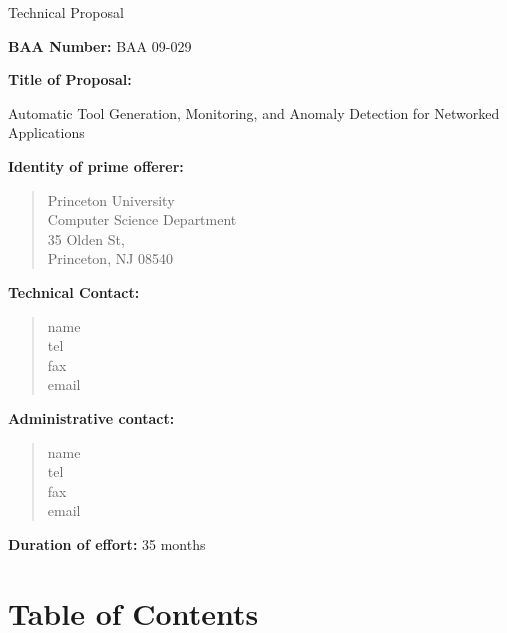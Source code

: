 \documentclass[12pt]{article}
\begin{document}
\begin{center}
{\Large Technical Proposal}
\end{center}

{\bf BAA Number:} BAA 09-029

\vspace{.5in}

{\bf Title of Proposal:}  

Automatic Tool Generation, Monitoring, and Anomaly Detection for Networked Applications

\vspace{.5in}

{\bf Identity of prime offerer:}
\begin{quote}
Princeton University \\
Computer Science Department \\
35 Olden St, \\
Princeton, NJ 08540
\end{quote}

\vspace{.5in}

{\bf Technical Contact:}  
\begin{quote}
name \\
tel \\
fax \\
email \\
\end{quote}

\vspace{.5in}

{\bf Administrative contact:}
\begin{quote}
name \\
tel \\
fax \\
email \\
\end{quote}

\vspace{.5in}

{\bf Duration of effort:} 35 months

\newpage

\setcounter{page}{1}
\appendix

\section{Table of Contents}
\tableofcontents\
\newpage
\pagenumbering{arabic}
\setcounter{page}{1}
\end{document}
